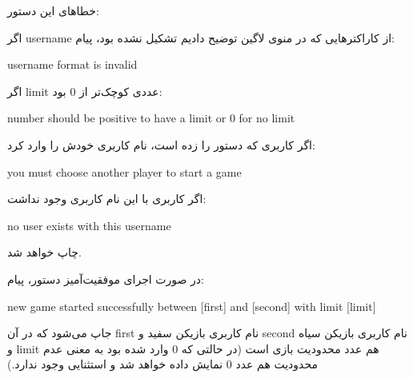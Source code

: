 \documentclass[]{article}
\begin{document}
خطاهای این دستور:

اگر username از کاراکترهایی که در منوی لاگین توضیح دادیم تشکیل نشده بود، پیام:

\begin{tcolorbox}[boxrule=0pt]
	\begin{latin}
  	  \large{
  	  	username format is invalid
		}
	\end{latin}
\end{tcolorbox}



اگر limit عددی کوچک‌تر از 0 بود:

\begin{tcolorbox}[boxrule=0pt]
	\begin{latin}
  	  \large{
  	  	number should be positive to have a limit or 0 for no limit
		}
	\end{latin}
\end{tcolorbox}



اگر کاربری که دستور را زده است، نام کاربری خودش را وارد کرد:

\begin{tcolorbox}[boxrule=0pt]
	\begin{latin}
  	  \large{
  	  	you must choose another player to start a game
		}
	\end{latin}
\end{tcolorbox}



اگر کاربری با این نام کاربری وجود نداشت:

\begin{tcolorbox}[boxrule=0pt]
	\begin{latin}
  	  \large{
  	  	no user exists with this username
		}
	\end{latin}
\end{tcolorbox}



چاپ خواهد شد.

در صورت اجرای موفقیت‌آمیز دستور، پیام:

\begin{tcolorbox}[boxrule=0pt]
	\begin{latin}
  	  \large{
  	  	new game started successfully between [first] and [second] with limit [limit]
		}
	\end{latin}
\end{tcolorbox}



جاپ می‌شود که در آن first نام کاربری بازیکن سفید و second نام کاربری بازیکن سیاه و limit هم عدد محدودیت بازی است (در حالتی که 0 وارد شده بود \- به معنی عدم محدودیت\- هم عدد 0 نمایش داده خواهد شد و استثنایی وجود ندارد.)
\end{document}
